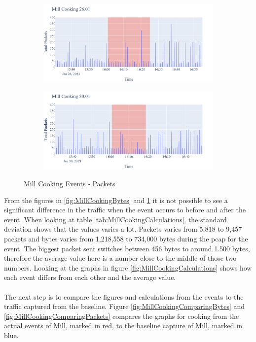 \begin{figure}[H]
\begin{subfigure}[b]{0.47\textwidth}
        \centering
        \includegraphics[width=1.2\hsize]{figures/Mill_Cooking_Packets_26.01.png}
    \end{subfigure}
    \hspace{0.6cm}
    \begin{subfigure}[b]{0.47\textwidth}
        \centering
        \includegraphics[width=1.2\hsize]{figures/Mill_Cooking_Packets_30.01.png}
    \end{subfigure}
    \caption{Mill Cooking Events - Packets}
    \label{fig:MillCookingPackets}
\end{figure}

From the figures in \ref{fig:MillCookingBytes} and \ref{fig:MillCookingPackets} it is not possible to see a significant difference in the traffic when the event occurs to before and after the event. When looking at table \ref{tab:MillCookingCalculations}, the standard deviation shows that the values varies a lot. Packets varies from 5,818 to 9,457 packets and bytes varies from 1,218,558 to 734,000 bytes during the pcap for the event. The biggest packet sent switches between 456 bytes to around 1.500 bytes, therefore the average value here is a number close to the middle of those two numbers. Looking at the graphs in figure \ref{fig:MillCookingCalculations} shows how each event differs from each other and the average value. 
\\\\
The next step is to compare the figures and calculations from the events to the traffic captured from the baseline. Figure \ref{fig:MillCookingComparingBytes} and \ref{fig:MillCookingComparingPackets} compares the graphs for cooking from the actual events of Mill, marked in red, to the baseline capture of Mill, marked in blue. 

